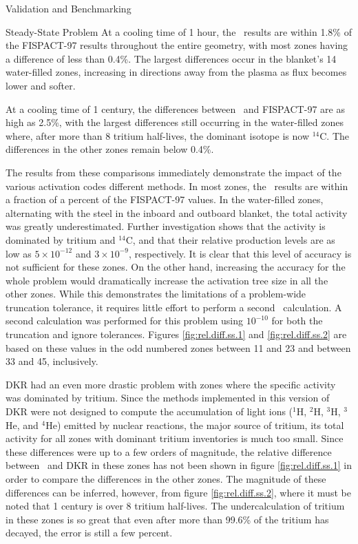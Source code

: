 \begin{chapter}{Validation and Benchmarking\label{chap:valid}}
\begin{section}{Steady-State Problem}
    At a cooling time of 1 hour, the \ALARA\ results are within 1.8\%
    of the FISPACT-97 results throughout the entire geometry, with
    most zones having a difference of less than 0.4\%.  The largest
    differences occur in the blanket's 14 water-filled zones,
    increasing in directions away from the plasma as flux becomes
    lower and softer.
    
    At a cooling time of 1 century, the differences between \ALARA\ 
    and FISPACT-97 are as high as 2.5\%, with the largest differences
    still occurring in the water-filled zones where, after more than 8
    tritium half-lives, the dominant isotope is now $^{14}$C.  The
    differences in the other zones remain below 0.4\%.
    
    The results from these comparisons immediately demonstrate the
    impact of the various activation codes different methods.  In most
    zones, the \ALARA\ results are within a fraction of a percent of
    the FISPACT-97 values.  In the water-filled zones, alternating
    with the steel in the inboard and outboard blanket, the total
    activity was greatly underestimated.  Further investigation shows
    that the activity is dominated by tritium and $^{14}$C, and that
    their relative production levels are as low as $5 \times 10^{-12}$
    and $3 \times 10^{-9}$, respectively.  It is clear that this level
    of accuracy is not sufficient for these zones.  On the other hand,
    increasing the accuracy for the whole problem would dramatically
    increase the activation tree size in all the other zones.  While
    this demonstrates the limitations of a problem-wide truncation
    tolerance, it requires little effort to perform a second \ALARA\ 
    calculation.  A second calculation was performed for this problem
    using $10^{-10}$ for both the truncation and ignore tolerances.
    Figures \ref{fig:rel.diff.ss.1} and \ref{fig:rel.diff.ss.2} are
    based on these values in the odd numbered zones between 11 and 23
    and between 33 and 45, inclusively.
    
    DKR had an even more drastic problem with zones where the specific
    activity was dominated by tritium.  Since the methods implemented
    in this version of DKR were not designed to compute the
    accumulation of light ions ($^1$H, $^2$H, $^3$H, $^3$He, and
    $^4$He) emitted by nuclear reactions, the major source of tritium,
    its total activity for all zones with dominant tritium inventories
    is much too small.  Since these differences were up to a few
    orders of magnitude, the relative difference between \ALARA\ and
    DKR in these zones has not been shown in figure
    \ref{fig:rel.diff.ss.1} in order to compare the differences in the
    other zones.  The magnitude of these differences can be inferred,
    however, from figure \ref{fig:rel.diff.ss.2}, where it must be
    noted that 1 century is over 8 tritium half-lives.  The
    undercalculation of tritium in these zones is so great that even
    after more than 99.6\% of the tritium has decayed, the error is
    still a few percent.
    

\end{section}
\end{chapter}
